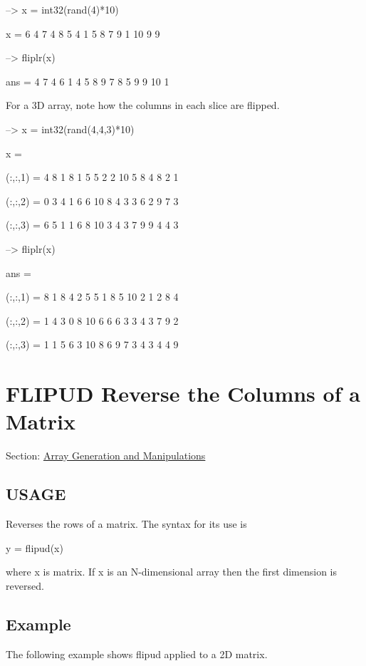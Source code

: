 \begin{DoxyVerbInclude}
--> x = int32(rand(4)*10)

x = 
  6  4  7  4 
  8  5  4  1 
  5  8  7  9 
  1 10  9  9 

--> fliplr(x)

ans = 
  4  7  4  6 
  1  4  5  8 
  9  7  8  5 
  9  9 10  1 
\end{DoxyVerbInclude}


For a 3\-D array, note how the columns in each slice are flipped.


\begin{DoxyVerbInclude}
--> x = int32(rand(4,4,3)*10)

x = 

(:,:,1) = 
  4  8  1  8 
  1  5  5  2 
  2 10  5  8 
  4  8  2  1 

(:,:,2) = 
  0  3  4  1 
  6  6 10  8 
  4  3  3  6 
  2  9  7  3 

(:,:,3) = 
  6  5  1  1 
  6  8 10  3 
  4  3  7  9 
  9  4  4  3 

--> fliplr(x)

ans = 

(:,:,1) = 
  8  1  8  4 
  2  5  5  1 
  8  5 10  2 
  1  2  8  4 

(:,:,2) = 
  1  4  3  0 
  8 10  6  6 
  6  3  3  4 
  3  7  9  2 

(:,:,3) = 
  1  1  5  6 
  3 10  8  6 
  9  7  3  4 
  3  4  4  9 
\end{DoxyVerbInclude}
 \hypertarget{array_flipud}{}\section{F\-L\-I\-P\-U\-D Reverse the Columns of a Matrix}\label{array_flipud}
Section\-: \hyperlink{sec_array}{Array Generation and Manipulations} \hypertarget{typecast_dec2bin_USAGE}{}\subsection{U\-S\-A\-G\-E}\label{typecast_dec2bin_USAGE}
Reverses the rows of a matrix. The syntax for its use is \begin{DoxyVerb}   y = flipud(x)
\end{DoxyVerb}
 where {\ttfamily x} is matrix. If {\ttfamily x} is an N-\/dimensional array then the first dimension is reversed. \hypertarget{variables_struct_Example}{}\subsection{Example}\label{variables_struct_Example}
The following example shows {\ttfamily flipud} applied to a 2\-D matrix.



